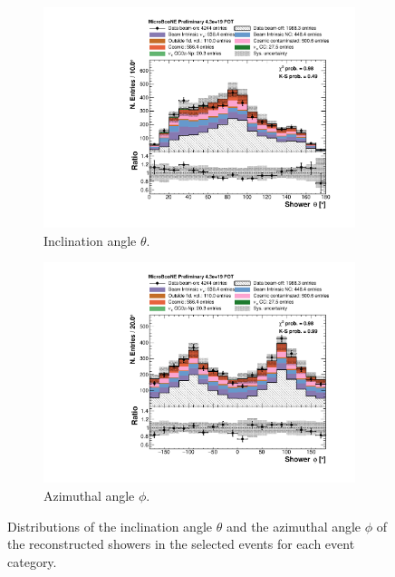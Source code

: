 \begin{figure}[htbp]
\centering
  \begin{subfigure}{0.49\textwidth}
    \includegraphics[width=\linewidth]{figures/h_shower_theta.pdf}
    \caption{Inclination angle $\theta$.} 
  \end{subfigure}
    \begin{subfigure}{0.49\textwidth}
    \includegraphics[width=\linewidth]{figures/h_shower_phi.pdf}
    \caption{Azimuthal angle $\phi$.} 
  \end{subfigure}
  \caption{Distributions of the inclination angle $\theta$ and the azimuthal angle $\phi$ of the reconstructed showers in the selected events for each event category.}\label{fig:thetaphi}
\end{figure}

